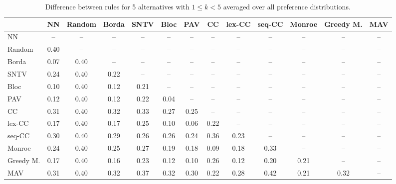 
\begin{table*}[htbp]
\centering
\begin{tabular}{lcccccccccccc}
\toprule
 & NN & Random & Borda & SNTV & Bloc & PAV & CC & lex-CC & seq-CC & Monroe & Greedy M. & MAV \\
\midrule
NN & -- & -- & -- & -- & -- & -- & -- & -- & -- & -- & -- & -- \\
Random & \cellcolor{blue!40} 0.40 & -- & -- & -- & -- & -- & -- & -- & -- & -- & -- & -- \\
Borda & \cellcolor{blue!7} 0.07 & \cellcolor{blue!40} 0.40 & -- & -- & -- & -- & -- & -- & -- & -- & -- & -- \\
SNTV & \cellcolor{blue!24} 0.24 & \cellcolor{blue!40} 0.40 & \cellcolor{blue!22} 0.22 & -- & -- & -- & -- & -- & -- & -- & -- & -- \\
Bloc & \cellcolor{blue!10} 0.10 & \cellcolor{blue!40} 0.40 & \cellcolor{blue!12} 0.12 & \cellcolor{blue!21} 0.21 & -- & -- & -- & -- & -- & -- & -- & -- \\
PAV & \cellcolor{blue!12} 0.12 & \cellcolor{blue!40} 0.40 & \cellcolor{blue!12} 0.12 & \cellcolor{blue!22} 0.22 & \cellcolor{blue!4} 0.04 & -- & -- & -- & -- & -- & -- & -- \\
CC & \cellcolor{blue!31} 0.31 & \cellcolor{blue!40} 0.40 & \cellcolor{blue!32} 0.32 & \cellcolor{blue!33} 0.33 & \cellcolor{blue!27} 0.27 & \cellcolor{blue!25} 0.25 & -- & -- & -- & -- & -- & -- \\
lex-CC & \cellcolor{blue!17} 0.17 & \cellcolor{blue!40} 0.40 & \cellcolor{blue!17} 0.17 & \cellcolor{blue!25} 0.25 & \cellcolor{blue!10} 0.10 & \cellcolor{blue!6} 0.06 & \cellcolor{blue!22} 0.22 & -- & -- & -- & -- & -- \\
seq-CC & \cellcolor{blue!30} 0.30 & \cellcolor{blue!40} 0.40 & \cellcolor{blue!28} 0.29 & \cellcolor{blue!26} 0.26 & \cellcolor{blue!26} 0.26 & \cellcolor{blue!24} 0.24 & \cellcolor{blue!36} 0.36 & \cellcolor{blue!23} 0.23 & -- & -- & -- & -- \\
Monroe & \cellcolor{blue!24} 0.24 & \cellcolor{blue!40} 0.40 & \cellcolor{blue!25} 0.25 & \cellcolor{blue!27} 0.27 & \cellcolor{blue!19} 0.19 & \cellcolor{blue!18} 0.18 & \cellcolor{blue!9} 0.09 & \cellcolor{blue!18} 0.18 & \cellcolor{blue!33} 0.33 & -- & -- & -- \\
Greedy M. & \cellcolor{blue!17} 0.17 & \cellcolor{blue!40} 0.40 & \cellcolor{blue!16} 0.16 & \cellcolor{blue!23} 0.23 & \cellcolor{blue!12} 0.12 & \cellcolor{blue!10} 0.10 & \cellcolor{blue!26} 0.26 & \cellcolor{blue!12} 0.12 & \cellcolor{blue!20} 0.20 & \cellcolor{blue!21} 0.21 & -- & -- \\
MAV & \cellcolor{blue!31} 0.31 & \cellcolor{blue!40} 0.40 & \cellcolor{blue!32} 0.32 & \cellcolor{blue!37} 0.37 & \cellcolor{blue!32} 0.32 & \cellcolor{blue!30} 0.30 & \cellcolor{blue!22} 0.22 & \cellcolor{blue!28} 0.28 & \cellcolor{blue!42} 0.42 & \cellcolor{blue!21} 0.21 & \cellcolor{blue!32} 0.32 & -- \\
\bottomrule
\end{tabular}

\caption{Difference between rules for 5 alternatives with $1 \leq k < 5$ averaged over all preference distributions.}
\label{tab:rule_distance_heatmap-m=[5]-pref_dist=all}
\end{table*}
    